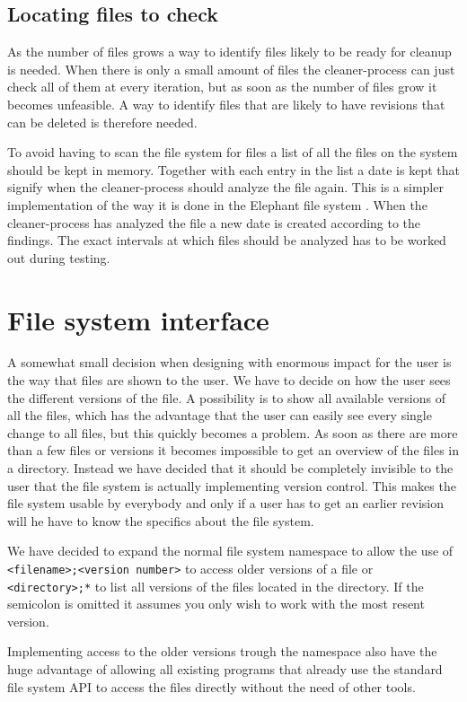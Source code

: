 \documentclass[12pt]{article}
\begin{document}
\subsection{Locating files to check}
As the number of files grows a way to identify files likely to be
ready for cleanup is needed. When there is only a small amount of
files the cleaner-process can just check all of them at every
iteration, but as soon as the number of files grow it becomes
unfeasible. A way to identify files that are likely to have revisions
that can be deleted is therefore needed.

To avoid having to scan the file system for files a list of all the
files on the system should be kept in memory. Together with each entry
in the list a date is kept that signify when the cleaner-process
should analyze the file again. This is a simpler implementation of the
way it is done in the Elephant file system \cite{Santry:1999gf}. When
the cleaner-process has analyzed the file a new date is created
according to the findings. The exact intervals at which files should
be analyzed has to be worked out during testing.

\section{File system interface}
A somewhat small decision when designing with enormous impact for the
user is the way that files are shown to the user.
We have to decide on how the user sees the different versions of the
file. A possibility is to show all available versions of all the
files,
which has the advantage that the user can easily see every single
change to all files, but this quickly becomes a problem.
As soon as there are more than a few files or versions it becomes
impossible to get an overview of the files in a directory.
Instead we have decided that it should be completely invisible to the
user that the file system is actually implementing version control.
This makes the file system usable by everybody and only if a user has
to get an earlier revision will he have to know the specifics about
the file system.

We have decided to expand the normal file system namespace to allow
the use of \texttt{<filename>;<version number>} to access older versions
of a file or \texttt{<directory>;*} to list all versions of the files
located in the directory. If the semicolon is omitted it assumes you
only wish to work with the most resent version.

Implementing access to the older versions trough the namespace also
have the huge advantage of allowing all existing programs that already
use the standard file system API to access the files directly without
the need of other tools.
\end{document}
